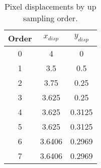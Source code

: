 \renewcommand\baselinestretch{1.3}\selectfont
\begin{table}[H]
\begin{center}
\begin{tabular}{|ccc|}
	\hline
	Order & $x_{disp}$ & $y_{disp}$\\
	\hline
	0 & 4 & 0\\
	1 & 3.5 & 0.5\\
	2 & 3.75 & 0.25\\
	3 & 3.625 & 0.25\\
	4 & 3.625 & 0.3125\\
	5 & 3.625 & 0.3125\\
	6 & 3.6406 & 0.2969\\
	7 & 3.6406 & 0.2969\\
	\hline
\end{tabular}
\caption{Pixel displacements by up sampling order.}
\label{table:piv_upsampling_displacement}
\end{center}
\end{table}
\renewcommand\baselinestretch{2}\selectfont
